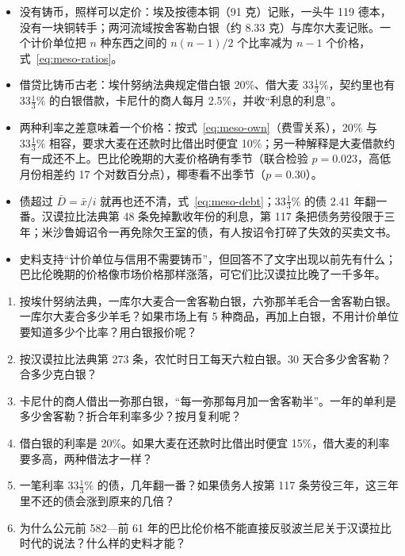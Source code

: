 \begin{takeaways}
\begin{itemize}
\item 没有铸币，照样可以定价：埃及按德本铜（91 克）记账，一头牛 119 德本，没有一块铜转手；两河流域按舍客勒白银（约 8.33 克）与库尔大麦记账。一个计价单位把 $n$ 种东西之间的 $n(n-1)/2$ 个比率减为 $n-1$ 个价格，式~\eqref{eq:meso-ratios}。
\item 借贷比铸币古老：埃什努纳法典规定借白银 20\%、借大麦 $33\tfrac{1}{3}\%$，契约里也有 $33\tfrac{1}{3}\%$ 的白银借款，卡尼什的商人每月 2.5\%，并收“利息的利息”。
\item 两种利率之差意味着一个价格：按式~\eqref{eq:meso-own}（费雪关系），20\% 与 $33\tfrac{1}{3}\%$ 相容，要求大麦在还款时比借出时便宜 10\%；另一种解释是大麦借款约有一成还不上。巴比伦晚期的大麦价格确有季节（联合检验 $p=0.023$，高低月份相差约 17 个对数百分点），椰枣看不出季节（$p=0.30$）。
\item 债超过 $\bar D=\bar x/i$ 就再也还不清，式~\eqref{eq:meso-debt}；$33\tfrac{1}{3}\%$ 的债 2.41 年翻一番。汉谟拉比法典第 48 条免掉歉收年份的利息，第 117 条把债务劳役限于三年；米沙鲁姆诏令一再免除欠王室的债，有人按诏令打碎了失效的买卖文书。
\item 史料支持“计价单位与信用不需要铸币”，但回答不了文字出现以前先有什么；巴比伦晚期的价格像市场价格那样涨落，可它们比汉谟拉比晚了一千多年。
\end{itemize}
\end{takeaways}

\begin{selfcheck}
\begin{enumerate}
\item 按埃什努纳法典，一库尔大麦合一舍客勒白银，六弥那羊毛合一舍客勒白银。一库尔大麦合多少羊毛？如果市场上有 5 种商品，再加上白银，不用计价单位要知道多少个比率？用白银报价呢？
\item 按汉谟拉比法典第 273 条，农忙时日工每天六粒白银。30 天合多少舍客勒？合多少克白银？
\item 卡尼什的商人借出一弥那白银，“每一弥那每月加一舍客勒半”。一年的单利是多少舍客勒？折合年利率多少？按月复利呢？
\item 借白银的利率是 20\%。如果大麦在还款时比借出时便宜 15\%，借大麦的利率要多高，两种借法才一样？
\item 一笔利率 $33\tfrac{1}{3}\%$ 的债，几年翻一番？如果债务人按第 117 条劳役三年，这三年里不还的债会涨到原来的几倍？
\item 为什么公元前 582—前 61 年的巴比伦价格不能直接反驳波兰尼关于汉谟拉比时代的说法？什么样的史料才能？
\end{enumerate}
\end{selfcheck}

